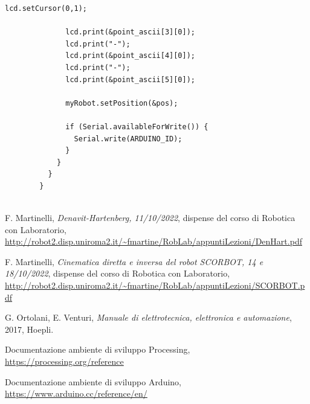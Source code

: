 \documentclass[a4paper]{article}
\begin{document}
\begin{lstlisting}[style=myarduinostyle, caption=Parti principali del firmware]
              lcd.setCursor(0,1);
        
              lcd.print(&point_ascii[3][0]);
              lcd.print("-");
              lcd.print(&point_ascii[4][0]);
              lcd.print("-");
              lcd.print(&point_ascii[5][0]);
        
              myRobot.setPosition(&pos);
        
              if (Serial.availableForWrite()) {
                Serial.write(ARDUINO_ID);
              }
            }
          }
        }
    
    \end{lstlisting}
    
    
    
    
    \begin{thebibliography}{10}
    
            F. Martinelli, \emph{Denavit-Hartenberg, 11/10/2022}, dispense del corso di Robotica con Laboratorio, \url{http://robot2.disp.uniroma2.it/~fmartine/RobLab/appuntiLezioni/DenHart.pdf}
        
            F. Martinelli, \emph{Cinematica diretta e inversa del robot SCORBOT, 14 e 18/10/2022}, dispense del corso di Robotica con Laboratorio, \url{http://robot2.disp.uniroma2.it/~fmartine/RobLab/appuntiLezioni/SCORBOT.pdf}
        
            G. Ortolani, E. Venturi, \emph{Manuale di elettrotecnica, elettronica e automazione}, 2017, Hoepli.
    
            Documentazione ambiente di sviluppo Processing, \url{https://processing.org/reference}
    
            Documentazione ambiente di sviluppo Arduino, \url{https://www.arduino.cc/reference/en/}
    
    \end{thebibliography}
\end{document}
